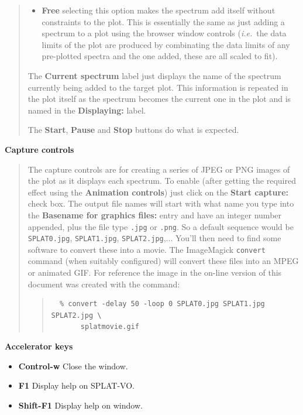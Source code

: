 \documentclass[twoside,11pt]{article}
\newcommand{\htmladdimg}[1]{}
\newcommand{\latexhtml}[2]{#1}
\renewcommand{\_}{\texttt{\symbol{95}}}
\newcommand{\SPLAT}{\textsf{SPLAT-VO}}
\newcommand{\labelitem}[1]{\textbf{#1}}
\newcommand{\hitext}[1]{\texttt{#1}}
\newcommand{\ie}{\textit{i.e.}}
\newcommand{\subheading}[1]{\textbf{\large{#1}}}
\begin{document}
\begin{quote}
\begin{itemize}
  \item \labelitem{Free} selecting this option makes the spectrum add
  itself without constraints to the plot. This is essentially the same
  as just adding a spectrum to a plot using the browser window controls
  (\ie\ the data limits of the plot are produced by combinating the
  data limits of any pre-plotted spectra and the one added, these are
  all scaled to fit).
 \end{itemize}

 The \labelitem{Current spectrum} label just displays the name of the
 spectrum currently being added to the target plot. This information is
 repeated in the plot itself as the spectrum becomes the current one in
 the plot and is named in the \labelitem{Displaying:} label.

 The \labelitem{Start}, \labelitem{Pause} and \labelitem{Stop} buttons
 do what is expected.
\end{quote}

\subheading{Capture controls}
\begin{quote}
 The capture controls are for creating a series of JPEG or PNG images of the
 plot as it displays each spectrum. To enable (after getting the
 required effect using the \labelitem{Animation controls}) just click
 on the \labelitem{Start capture:} check box. The output file names
 will start with what name you type into the \labelitem{Basename for
 graphics files:} entry and have an integer number appended, plus the file type
 \hitext{.jpg} or \hitext{.png}. So a default sequence would be
 \hitext{SPLAT0.jpg}, \hitext{SPLAT1.jpg}, \hitext{SPLAT2.jpg},...
 You'll then need to find some software to convert these into a movie.
 The ImageMagick \hitext{convert} command (when suitably configured)
 will convert these files into an MPEG or animated GIF.
 \latexhtml{For reference the image in the on-line version of this
 document was created with the command:}{The image below was created
 with the command (note that the images were also scaled):}
 \begin{quote}
 \begin{verbatim}
  % convert -delay 50 -loop 0 SPLAT0.jpg SPLAT1.jpg SPLAT2.jpg \
       splatmovie.gif
 \end{verbatim}
 \end{quote}
 \htmladdimg{splatmovie.gif}
\end{quote}

\subheading{Accelerator keys}

\begin{itemize}
\item \labelitem{Control-w} Close the window.
\item \labelitem{F1} Display help on \SPLAT.
\item \labelitem{Shift-F1} Display help on window.
\end{itemize}
\end{document}
